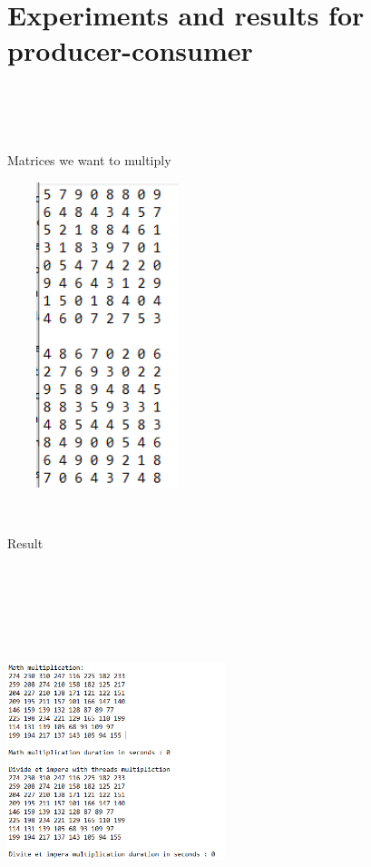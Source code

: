 \documentclass[14pt]{article}
\begin{document}
\section*{Experiments and results for producer-consumer}
\\\\\\
\begin{center}
Matrices we want to multiply\\
\vspace{10mm}

\includegraphics[height=3.5in, width = 2.3in]{result1.png}\\
\end{center}\\
\begin{center}
\newpage
Result\\
\vspace{10mm}

\includegraphics[height=4.5in, width = 2.5in]{result2.png}\\
\end{center}
\end{document}
